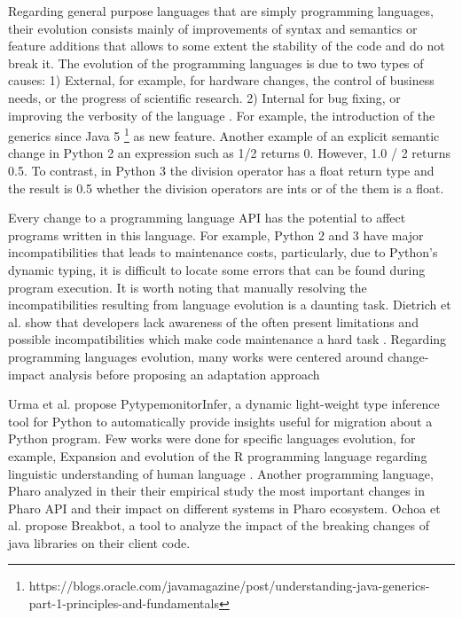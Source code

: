 Regarding general purpose languages that are simply programming languages, their evolution consists mainly of improvements of syntax and semantics or feature additions that allows to some extent the stability of the code and do not break it.
 The evolution of the programming languages is due to two types of causes: 1) External, for example, for hardware changes, the control of business needs, or the progress of scientific research. 2) Internal for bug fixing, or improving the verbosity of the language \cite{urma2017programming}.
 For example, the introduction of the generics since Java 5 \footnote{https://blogs.oracle.com/javamagazine/post/understanding-java-generics-part-1-principles-and-fundamentals} as new feature. Another example of an explicit semantic change in Python 2 an expression such as 1/2 returns 0. However, 1.0 / 2 returns 0.5. To contrast, in Python 3 the division operator has a float return type and the result is 0.5 whether the division operators are ints or of the them is a float.
 
 Every change to a programming language API has the potential to affect programs written in this language. 
 For example, Python 2 and 3 have major incompatibilities that leads to maintenance costs, particularly, due to Python’s dynamic typing, it is difficult to locate some errors that can  be found during program execution.
 It is worth noting that manually resolving the incompatibilities resulting from language evolution is a daunting task.
Dietrich et al. show that developers lack awareness of the 
 often present limitations and possible incompatibilities which make code maintenance a hard task \cite{dietrich2016java}.
Regarding programming languages evolution, many works were centered around change-impact analysis before proposing an adaptation approach \cite{arnold1996software,ren2004chianti,ryder2001change}

 
 Urma et al.\cite{urma2017programming} propose PytypemonitorInfer, a dynamic light-weight type inference tool for Python to automatically provide insights useful for migration about a Python program. Few works were done for specific languages evolution, for example, Expansion and evolution of the R programming language regarding linguistic understanding of human language \cite{urma2017programming}.
Another programming language, Pharo \cite{7332471} analyzed in their their empirical study the most important changes in Pharo API and their impact on different systems in Pharo ecosystem.
Ochoa et al. \cite{10.1145/3510455.3512783} propose Breakbot, a tool to analyze the impact of  the breaking changes of java libraries on their client code.

